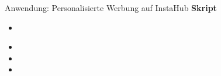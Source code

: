 \begin{frame}[fragile]{Anwendung: Personalisierte Werbung auf InstaHub}
  \textbf{Skript}
  \begin{itemize}
    \item {}\\
    \item {}
    \item {}
    \item {}
  \end{itemize}
\end{frame}